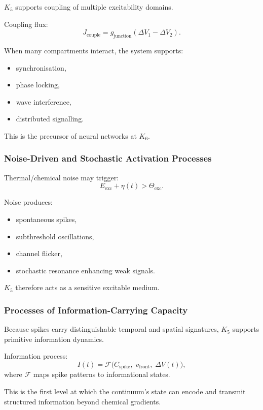 $K_5$ supports coupling of multiple excitability domains.

Coupling flux:
\[
J_{\text{couple}} = g_{\text{junction}}(\Delta V_1 - \Delta V_2).
\]

When many compartments interact, the system supports:
\begin{itemize}
    \item synchronisation,
    \item phase locking,
    \item wave interference,
    \item distributed signalling.
\end{itemize}

This is the precursor of neural networks at $K_6$.

\subsubsection{Noise-Driven and Stochastic Activation Processes}

Thermal/chemical noise may trigger:
\[
E_{\text{exc}} + \eta(t) > \Theta_{\text{exc}}.
\]

Noise produces:
\begin{itemize}
    \item spontaneous spikes,
    \item subthreshold oscillations,
    \item channel flicker,
    \item stochastic resonance enhancing weak signals.
\end{itemize}

$K_5$ therefore acts as a sensitive excitable medium.

\subsubsection{Processes of Information-Carrying Capacity}

Because spikes carry distinguishable temporal and spatial signatures,
$K_5$ supports primitive information dynamics.

Information process:
\[
I(t) = \mathcal{F}\big(C_{\text{spike}},\; v_{\text{front}},\; \Delta V(t)\big),
\]
where $\mathcal{F}$ maps spike patterns to informational states.

This is the first level at which the continuum’s state can encode 
and transmit structured information beyond chemical gradients.

